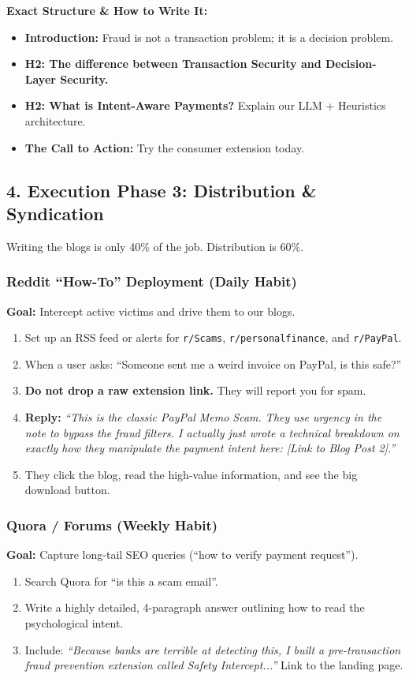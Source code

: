 \documentclass[11pt, letterpaper]{article}
\begin{document}
\textbf{Exact Structure \& How to Write It:}
\begin{itemize}
    \item \textbf{Introduction:} Fraud is not a transaction problem; it is a decision problem.
    \item \textbf{H2: The difference between Transaction Security and Decision-Layer Security.}
    \item \textbf{H2: What is Intent-Aware Payments?} Explain our LLM + Heuristics architecture.
    \item \textbf{The Call to Action:} Try the consumer extension today.
\end{itemize}

\subsection*{4. Execution Phase 3: Distribution \& Syndication}

Writing the blogs is only 40\% of the job. Distribution is 60\%.

\subsubsection*{Reddit ``How-To'' Deployment (Daily Habit)}
\textbf{Goal:} Intercept active victims and drive them to our blogs.
\begin{enumerate}
    \item Set up an RSS feed or alerts for \texttt{r/Scams}, \texttt{r/personalfinance}, and \texttt{r/PayPal}.
    \item When a user asks: ``Someone sent me a weird invoice on PayPal, is this safe?''
    \item \textbf{Do not drop a raw extension link.} They will report you for spam.
    \item \textbf{Reply:} \textit{``This is the classic PayPal Memo Scam. They use urgency in the note to bypass the fraud filters. I actually just wrote a technical breakdown on exactly how they manipulate the payment intent here: [Link to Blog Post 2].''}
    \item They click the blog, read the high-value information, and see the big download button.
\end{enumerate}

\subsubsection*{Quora / Forums (Weekly Habit)}
\textbf{Goal:} Capture long-tail SEO queries (``how to verify payment request'').
\begin{enumerate}
    \item Search Quora for ``is this a scam email''.
    \item Write a highly detailed, 4-paragraph answer outlining how to read the psychological intent.
    \item Include: \textit{``Because banks are terrible at detecting this, I built a pre-transaction fraud prevention extension called Safety Intercept...''} Link to the landing page.
\end{enumerate}
\end{document}
